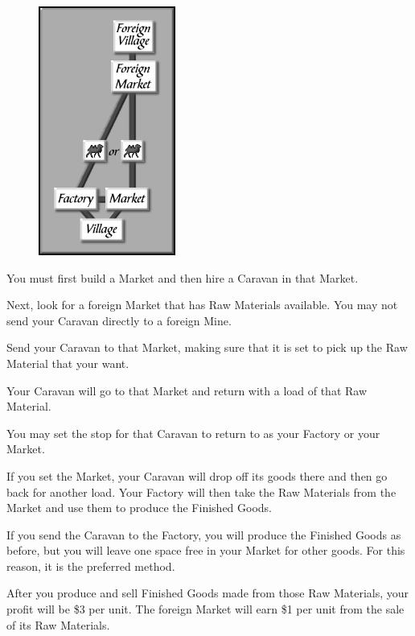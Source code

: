 \begin{figure}
	\vspace{-20pt}
	\begin{center}
		\includegraphics[width=0.4\textwidth]{Itradesit2}
	\end{center}
	\vspace{-20pt}
\end{figure}

You must first build a Market and then hire a Caravan in that Market.

Next, look for a foreign Market that has Raw Materials available. You may not send
your Caravan directly to a foreign Mine.

Send your Caravan to that Market, making sure that it is set to pick up the Raw Material that your want.

Your Caravan will go to that Market and return with a load of that Raw Material.

You may set the stop for that Caravan to return to as your Factory or your Market.

If you set the Market, your Caravan will drop off its goods there and then go back for another load. Your Factory will then take the Raw Materials from the Market and use them to produce the Finished Goods.

If you send the Caravan to the Factory, you will produce the Finished Goods as before, but you will leave one space free in your Market for other goods. For this reason, it is the preferred method.

After you produce and sell Finished Goods made from those Raw Materials, your profit will be \$3 per unit. The foreign Market will earn \$1 per unit from the sale of its Raw Materials.

